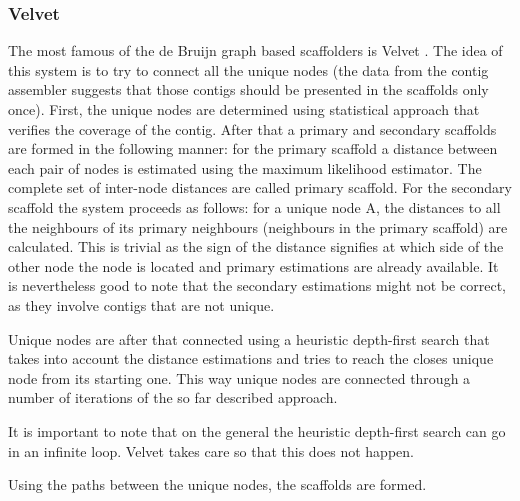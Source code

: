 \documentclass[11pt]{article}
\begin{document}

\subsubsection{Velvet} %
\label{ssub:Velvet}
The most famous of the de Bruijn graph based scaffolders is Velvet
\cite{velvet-scaffolding}. The idea of this system is to try to connect all the
unique nodes (the data from the contig assembler suggests that those contigs
should be presented in the scaffolds only once). First, the unique nodes are
determined using statistical approach that verifies the coverage of the contig.
After that a primary and secondary scaffolds are formed in the following manner:
for the primary scaffold a distance between each pair of nodes is estimated
using the maximum likelihood estimator. The complete set of inter-node distances
are called primary scaffold. For the secondary scaffold the system proceeds as
follows: for a unique node A, the distances to all the neighbours of its primary
neighbours (neighbours in the primary scaffold) are calculated. This is trivial
as the sign of the distance signifies at which side of the other node the node
is located and primary estimations are already available. It is nevertheless
good to note that the secondary estimations might not be correct, as they
involve contigs that are not unique.

Unique nodes are after that connected using a heuristic depth-first search that
takes into account the distance estimations and tries to reach the closes unique
node from its starting one. This way unique nodes are connected through a number
of iterations of the so far described approach. 

It is important to note that on the general the heuristic depth-first search can
go in an infinite loop. Velvet takes care so that this does not happen.

Using the paths between the unique nodes, the scaffolds are formed.


\end{document}
